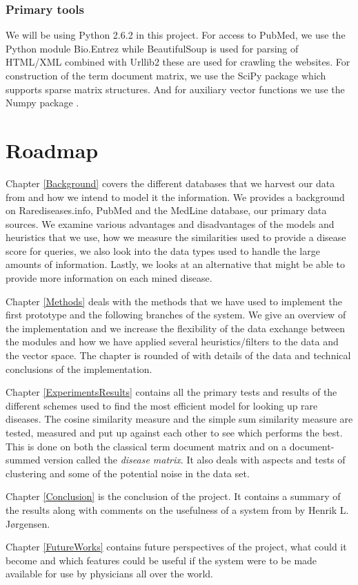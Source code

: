 
\subsubsection{Primary tools}
We will be using Python 2.6.2 \cite{PythonLanguage} in this project. For access to PubMed, we use
the Python module Bio.Entrez \cite{EntrezProgUtil} while BeautifulSoup
\cite{BS} is used for parsing of HTML/XML combined with Urllib2
\cite{UL2} these are used for crawling the websites. For construction
of the term document matrix, we use the SciPy package \cite{SciPy}
which supports sparse matrix structures. And for auxiliary vector
functions we use the Numpy package \cite{NumPy}.

\section{Roadmap}

Chapter \ref{Background} covers the different databases that we
harvest our data from and how we intend to model it the
information. We provides a background on Rarediseases.info, PubMed and
the MedLine database, our primary data sources. We examine various
advantages and disadvantages of the models and heuristics that we use,
how we measure the similarities used to provide a disease score for
queries, we also look into the data types used to handle the large
amounts of information. Lastly, we looks at an alternative that might
be able to provide more information on each mined disease.

Chapter \ref{Methods} deals with the methods that we have used to
implement the first prototype and the following branches of the
system. We give an overview of the implementation and we increase the
flexibility of the data exchange between the modules and how we have
applied several heuristics/filters to the data and the vector
space. The chapter is  rounded of
with details of the data and technical conclusions of the
implementation.

Chapter \ref{ExperimentsResults} contains all the primary tests and
results of the different schemes used to find the most efficient model
for looking up rare diseases. The cosine similarity measure and the
simple sum similarity measure are tested, measured and put up against
each other to see which performs the best. This is done on both the
classical term document matrix and on a document-summed version called
the \textit{disease matrix}. It also deals with aspects and tests of
clustering and some of the potential noise in the data set.

Chapter \ref{Conclusion} is the conclusion of the project. It contains
a summary of the results along with comments on the usefulness of
a system from by Henrik L. J\o rgensen.


Chapter \ref{FutureWorks} contains future perspectives of the project,
what could it become and which features could be useful if the system
were to be made available for use by physicians all over the world.

